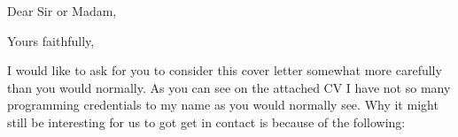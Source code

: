 \documentclass[11pt,a4paper,sans]{moderncv}        %
\begin{document}
 
\setcounter{page}{2}
\date{January 01, 1984}
\opening{Dear Sir or Madam,}
\closing{Yours faithfully,}
\makelettertitle
\justify
I would like to ask for you to consider this cover letter somewhat more
carefully than you would normally. As you can see on the attached CV I have not
so many programming credentials to my name as you would normally see. Why it
might still be interesting for us to got get in contact is because of the
following:
\renewcommand{\labelitemi}{\textbullet}
\end{document}
